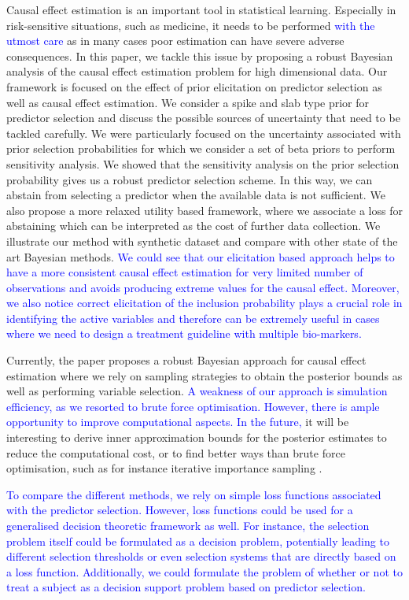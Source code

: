 \documentclass[preprint,12pt]{elsarticle}
\newcommand{\added}[1]{\textcolor{blue}{#1}}
\begin{document}
Causal effect estimation is an important tool in statistical learning.
Especially in risk-sensitive situations, such as medicine, it needs to
be performed \added{with the utmost care} as in many cases poor estimation can have severe adverse consequences.
In this paper, we tackle this issue by proposing a robust Bayesian analysis of the causal 
effect estimation problem for high dimensional data. Our 
framework is focused on the effect of prior elicitation on
predictor selection
as well as causal effect estimation. We consider a spike and slab type
prior for predictor selection and discuss the possible sources of uncertainty that
need to be tackled carefully. We were particularly focused on the uncertainty associated
with prior selection probabilities for which we consider a set of beta priors to perform
sensitivity analysis. We showed that the sensitivity analysis on the prior selection probability
gives us a robust predictor selection scheme. In this way, we can abstain from selecting
a predictor when the available data is not sufficient. We also propose a more relaxed
utility based framework, where we associate a loss for abstaining which can be interpreted 
as the cost of further data collection. We illustrate our method with synthetic dataset
and compare with other state of the art Bayesian methods. \added{We could see that our elicitation based approach helps to have a more consistent causal effect estimation for very limited number of observations and avoids producing extreme values for the causal effect. Moreover, we also notice correct elicitation of the inclusion probability plays a crucial role in identifying the active variables and therefore can be extremely useful in cases where we need to design a treatment guideline with multiple bio-markers. }


Currently, the paper proposes a robust Bayesian approach for causal effect estimation where
we rely on sampling strategies to obtain the posterior bounds as well as performing 
variable selection.
\added{%
A weakness of our approach is simulation efficiency,
as we resorted to brute force optimisation.
However, there is ample opportunity to improve computational aspects.%
}
\added{In the future,} it will be interesting to derive inner approximation bounds
for the posterior estimates to reduce the computational cost,
or to find better ways than brute force optimisation, such as for instance iterative importance sampling \citep{cruz22_importance}.

\added{To compare the different methods, we rely on simple loss functions
associated with the predictor selection. However,
loss functions could be used for a generalised
decision theoretic framework as well.
For instance,
the selection problem itself could be formulated as a decision problem,
potentially leading to different selection thresholds or even selection systems that are directly based on a loss function.
Additionally, we could formulate the 
problem of whether or not to treat a subject as a decision support problem
based on predictor selection.%
}
\end{document}
